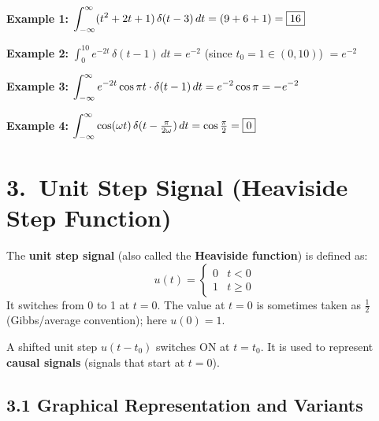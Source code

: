 \documentclass[10pt,a4paper]{article}
\newcommand{\Int}{\displaystyle\int_{-\infty}^{\infty}}
\begin{document}
\begin{exbox}
\textbf{Example 1:} $\displaystyle\Int (t^2+2t+1)\,\delta(t-3)\,dt = (9+6+1) = \boxed{16}$

\textbf{Example 2:} $\displaystyle\int_0^{10} e^{-2t}\,\delta(t-1)\,dt = e^{-2}$ \quad (since $t_0=1\in(0,10)$) $=\boxed{e^{-2}}$

\textbf{Example 3:} $\displaystyle\Int e^{-2t}\cos\pi t\cdot\delta(t-1)\,dt = e^{-2}\cos\pi = -e^{-2}$

\textbf{Example 4:} $\displaystyle\Int \cos(\omega t)\,\delta(t-\tfrac{\pi}{2\omega})\,dt = \cos\tfrac{\pi}{2}=\boxed{0}$
\end{exbox}

\section{3.\ Unit Step Signal (Heaviside Step Function)}

\begin{defbox}
The \textbf{unit step signal} (also called the \textbf{Heaviside function}) is defined as:
\[
  u(t) = \begin{cases} 0 & t < 0 \\ 1 & t \geq 0 \end{cases}
\]
It switches from 0 to 1 at $t=0$. The value at $t=0$ is sometimes taken as $\tfrac{1}{2}$ (Gibbs/average convention); here $u(0)=1$.

A shifted unit step $u(t-t_0)$ switches ON at $t=t_0$. It is used to represent \textbf{causal signals} (signals that start at $t=0$).
\end{defbox}

\subsection*{3.1 Graphical Representation and Variants}
\end{document}
